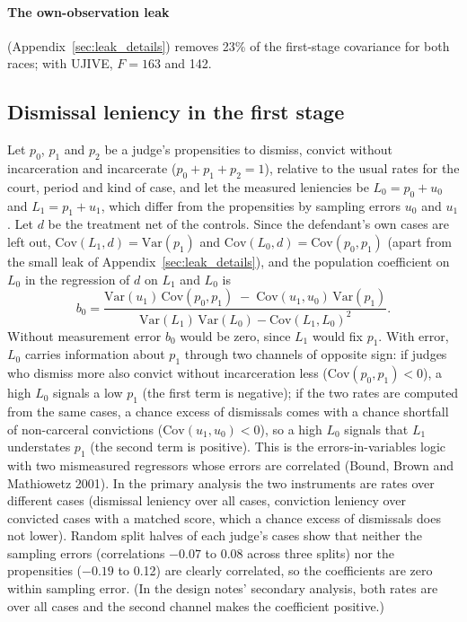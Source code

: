 \documentclass[11pt]{article}
\begin{document}
\paragraph{The own-observation leak} (Appendix~\ref{sec:leak_details}) removes 23\% of the first-stage covariance for both races; with UJIVE, $F = 163$ and 142.

\subsection{Dismissal leniency in the first stage}\label{sec:dismissal_details}

Let $p_0$, $p_1$ and $p_2$ be a judge's propensities to dismiss, convict without incarceration and incarcerate ($p_0 + p_1 + p_2 = 1$), relative to the usual rates for the court, period and kind of case, and let the measured leniencies be $L_0 = p_0 + u_0$ and $L_1 = p_1 + u_1$, which differ from the propensities by sampling errors $u_0$ and $u_1$. Let $d$ be the treatment net of the controls. Since the defendant's own cases are left out, $\mathrm{Cov}(L_1, d) = \mathrm{Var}(p_1)$ and $\mathrm{Cov}(L_0, d) = \mathrm{Cov}(p_0, p_1)$ (apart from the small leak of Appendix~\ref{sec:leak_details}), and the population coefficient on $L_0$ in the regression of $d$ on $L_1$ and $L_0$ is
\begin{equation*}
b_0 = \frac{\mathrm{Var}(u_1)\,\mathrm{Cov}(p_0, p_1) \;-\; \mathrm{Cov}(u_1, u_0)\,\mathrm{Var}(p_1)}{\mathrm{Var}(L_1)\,\mathrm{Var}(L_0) - \mathrm{Cov}(L_1, L_0)^2}.
\end{equation*}
Without measurement error $b_0$ would be zero, since $L_1$ would fix $p_1$. With error, $L_0$ carries information about $p_1$ through two channels of opposite sign: if judges who dismiss more also convict without incarceration less ($\mathrm{Cov}(p_0, p_1) < 0$), a high $L_0$ signals a low $p_1$ (the first term is negative); if the two rates are computed from the same cases, a chance excess of dismissals comes with a chance shortfall of non-carceral convictions ($\mathrm{Cov}(u_1, u_0) < 0$), so a high $L_0$ signals that $L_1$ understates $p_1$ (the second term is positive). This is the errors-in-variables logic with two mismeasured regressors whose errors are correlated (Bound, Brown and Mathiowetz 2001). In the primary analysis the two instruments are rates over different cases (dismissal leniency over all cases, conviction leniency over convicted cases with a matched score, which a chance excess of dismissals does not lower). Random split halves of each judge's cases show that neither the sampling errors (correlations $-0.07$ to 0.08 across three splits) nor the propensities ($-0.19$ to 0.12) are clearly correlated, so the coefficients are zero within sampling error. (In the design notes' secondary analysis, both rates are over all cases and the second channel makes the coefficient positive.)
\end{document}
